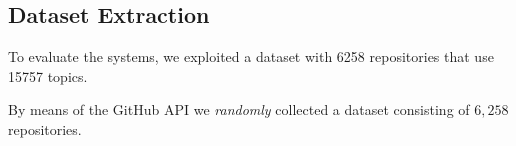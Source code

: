 \subsection{Dataset Extraction} \label{sec:Dataset}



To evaluate the systems, we exploited a dataset with 6258 \GH repositories that use 15757 topics.

By means of the GitHub API \cite{githubAPI} we \emph{randomly} collected a dataset consisting of $6,258$ repositories. 





